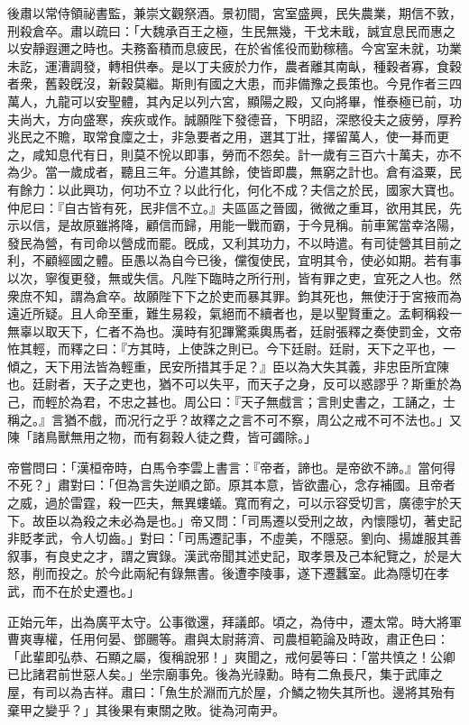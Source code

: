 \begin{pinyinscope}
後肅以常侍領祕書監，兼崇文觀祭酒。景初間，宮室盛興，民失農業，期信不敦，刑殺倉卒。肅以疏曰：「大魏承百王之極，生民無幾，干戈未戢，誠宜息民而惠之以安靜遐邇之時也。夫務畜積而息疲民，在於省傜役而勤稼穡。今宮室未就，功業未訖，運漕調發，轉相供奉。是以丁夫疲於力作，農者離其南畒，種穀者寡，食穀者衆，舊穀旣沒，新穀莫繼。斯則有國之大患，而非備豫之長策也。今見作者三四萬人，九龍可以安聖體，其內足以列六宮，顯陽之殿，又向將畢，惟泰極已前，功夫尚大，方向盛寒，疾疢或作。誠願陛下發德音，下明詔，深愍役夫之疲勞，厚矜兆民之不贍，取常食廩之士，非急要者之用，選其丁壯，擇留萬人，使一朞而更之，咸知息代有日，則莫不恱以即事，勞而不怨矣。計一歲有三百六十萬夫，亦不為少。當一歲成者，聽且三年。分遣其餘，使皆即農，無窮之計也。倉有溢粟，民有餘力：以此興功，何功不立？以此行化，何化不成？夫信之於民，國家大寶也。仲尼曰：『自古皆有死，民非信不立。』夫區區之晉國，微微之重耳，欲用其民，先示以信，是故原雖將降，顧信而歸，用能一戰而霸，于今見稱。前車駕當幸洛陽，發民為營，有司命以營成而罷。旣成，又利其功力，不以時遣。有司徒營其目前之利，不顧經國之體。臣愚以為自今已後，儻復使民，宜明其令，使必如期。若有事以次，寧復更發，無或失信。凡陛下臨時之所行刑，皆有罪之吏，宜死之人也。然衆庶不知，謂為倉卒。故願陛下下之於吏而暴其罪。鈞其死也，無使汙于宮掖而為遠近所疑。且人命至重，難生易殺，氣絕而不續者也，是以聖賢重之。孟軻稱殺一無辜以取天下，仁者不為也。漢時有犯蹕驚乘輿馬者，廷尉張釋之奏使罰金，文帝恠其輕，而釋之曰：『方其時，上使誅之則已。今下廷尉。廷尉，天下之平也，一傾之，天下用法皆為輕重，民安所措其手足？』臣以為大失其義，非忠臣所宜陳也。廷尉者，天子之吏也，猶不可以失平，而天子之身，反可以惑謬乎？斯重於為己，而輕於為君，不忠之甚也。周公曰：『天子無戲言；言則史書之，工誦之，士稱之。』言猶不戲，而况行之乎？故釋之之言不可不察，周公之戒不可不法也。」又陳「諸鳥獸無用之物，而有芻穀人徒之費，皆可蠲除。」




帝嘗問曰：「漢桓帝時，白馬令李雲上書言：『帝者，諦也。是帝欲不諦。』當何得不死？」肅對曰：「但為言失逆順之節。原其本意，皆欲盡心，念存補國。且帝者之威，過於雷霆，殺一匹夫，無異螻蟻。寬而宥之，可以示容受切言，廣德宇於天下。故臣以為殺之未必為是也。」帝又問：「司馬遷以受刑之故，內懷隱切，著史記非貶孝武，令人切齒。」對曰：「司馬遷記事，不虛美，不隱惡。劉向、揚雄服其善叙事，有良史之才，謂之實錄。漢武帝聞其述史記，取孝景及己本紀覽之，於是大怒，削而投之。於今此兩紀有錄無書。後遭李陵事，遂下遷蠶室。此為隱切在孝武，而不在於史遷也。」




正始元年，出為廣平太守。公事徵還，拜議郎。頃之，為侍中，遷太常。時大將軍曹爽專權，任用何晏、鄧颺等。肅與太尉蔣濟、司農桓範論及時政，肅正色曰：「此輩即弘恭、石顯之屬，復稱說邪！」爽聞之，戒何晏等曰：「當共慎之！公卿已比諸君前世惡人矣。」坐宗廟事免。後為光祿勳。時有二魚長尺，集于武庫之屋，有司以為吉祥。肅曰：「魚生於淵而亢於屋，介鱗之物失其所也。邊將其殆有棄甲之變乎？」其後果有東關之敗。徙為河南尹。



\end{pinyinscope}

